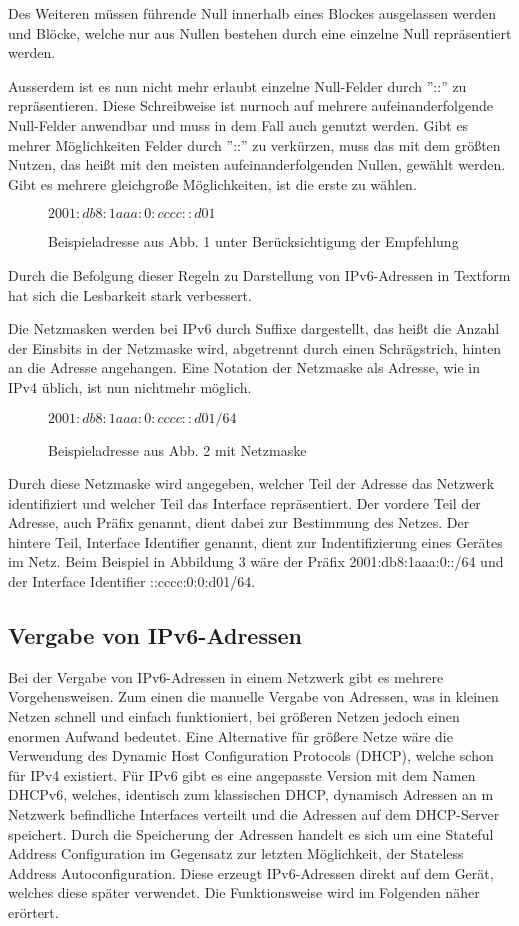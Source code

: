 \documentclass[a4paper, 12pt]{scrartcl}
\begin{document}
Des Weiteren müssen führende Null innerhalb eines Blockes ausgelassen werden und Blöcke, welche nur aus Nullen bestehen durch eine einzelne Null repräsentiert werden.

Ausserdem ist es nun nicht mehr erlaubt einzelne Null-Felder durch ''::'' zu repräsentieren. Diese Schreibweise ist nurnoch auf mehrere aufeinanderfolgende Null-Felder anwendbar und muss in dem Fall auch genutzt werden. Gibt es mehrer Möglichkeiten Felder durch ''::'' zu verkürzen, muss das mit dem größten Nutzen, das heißt mit den meisten aufeinanderfolgenden Nullen, gewählt werden. Gibt es mehrere gleichgroße Möglichkeiten, ist die erste zu wählen.


\begin{figure}[h]
	\centering
	$2001:db8:1aaa:0:cccc::d01$
	\caption{Beispieladresse aus Abb. 1 unter Berücksichtigung der Empfehlung}
\end{figure}

Durch die Befolgung dieser Regeln zu Darstellung von IPv6-Adressen in Textform hat sich die Lesbarkeit stark verbessert.

Die Netzmasken werden bei IPv6 durch Suffixe dargestellt, das heißt die Anzahl der Einsbits in der Netzmaske wird, abgetrennt durch einen Schrägstrich, hinten an die Adresse angehangen.
Eine Notation der Netzmaske als Adresse, wie in IPv4 üblich, ist nun nichtmehr möglich.


\begin{figure}[h]
	\centering
	$2001:db8:1aaa:0:cccc::d01/64$
	\caption{Beispieladresse aus Abb. 2 mit Netzmaske}
\end{figure}

Durch diese Netzmaske wird angegeben, welcher Teil der Adresse das Netzwerk identifiziert und welcher Teil das Interface repräsentiert. Der vordere Teil der Adresse, auch Präfix genannt, dient dabei zur Bestimmung des Netzes.
Der hintere Teil, Interface Identifier genannt, dient zur Indentifizierung eines Gerätes im Netz.
Beim Beispiel in Abbildung 3 wäre der Präfix 2001:db8:1aaa:0::/64 und der Interface Identifier ::cccc:0:0:d01/64.


\subsection{Vergabe von IPv6-Adressen}
Bei der Vergabe von IPv6-Adressen in einem Netzwerk gibt es mehrere Vorgehensweisen. Zum einen die manuelle Vergabe von Adressen, was in kleinen Netzen schnell und einfach funktioniert, bei größeren Netzen jedoch einen enormen Aufwand bedeutet. 
Eine Alternative für größere Netze wäre die Verwendung des Dynamic Host Configuration Protocols (DHCP), welche schon für IPv4 existiert. Für IPv6 gibt es eine angepasste Version mit dem Namen DHCPv6, welches, identisch zum klassischen DHCP, dynamisch Adressen an m Netzwerk befindliche Interfaces verteilt und die Adressen auf dem DHCP-Server speichert. Durch die Speicherung der Adressen handelt es sich um eine Stateful Address Configuration im Gegensatz zur letzten Möglichkeit, der Stateless Address Autoconfiguration. 
Diese erzeugt IPv6-Adressen direkt auf dem Gerät, welches diese später verwendet. Die Funktionsweise wird im Folgenden näher erörtert.
\end{document}
